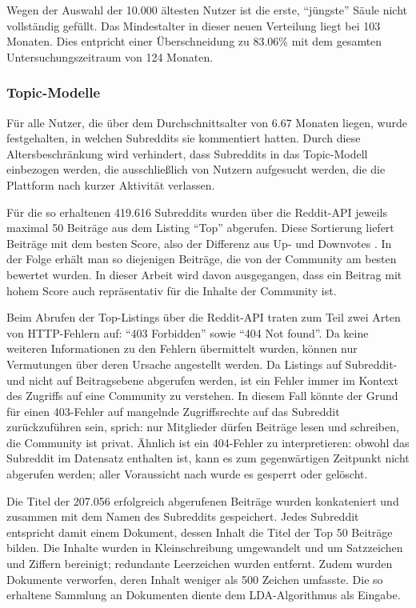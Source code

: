 \documentclass[11pt,a4paper,twoside]{article}
\begin{document}
Wegen der Auswahl der 10.000 ältesten Nutzer ist die erste,
\enquote{jüngste} Säule nicht vollständig gefüllt. Das Mindestalter in
dieser neuen Verteilung liegt bei 103 Monaten. Dies entpricht einer
Überschneidung zu 83.06\% mit dem gesamten Untersuchungszeitraum von 124
Monaten.

\hypertarget{topic-modelle-1}{%
\subsubsection{Topic-Modelle}\label{topic-modelle-1}}

Für alle Nutzer, die über dem Durchschnittsalter von 6.67 Monaten
liegen, wurde festgehalten, in welchen Subreddits sie kommentiert
hatten. Durch diese Altersbeschränkung wird verhindert, dass Subreddits
in das Topic-Modell einbezogen werden, die ausschließlich von Nutzern
aufgesucht werden, die die Plattform nach kurzer Aktivität verlassen.

Für die so erhaltenen 419.616 Subreddits wurden über die Reddit-API
jeweils maximal 50 Beiträge aus dem Listing \enquote{Top} abgerufen.
Diese Sortierung liefert Beiträge mit dem besten Score, also der
Differenz aus Up- und Downvotes \autocite{RedditSrc}. In der Folge
erhält man so diejenigen Beiträge, die von der Community am besten
bewertet wurden. In dieser Arbeit wird davon ausgegangen, dass ein
Beitrag mit hohem Score auch repräsentativ für die Inhalte der Community
ist.

Beim Abrufen der Top-Listings über die Reddit-API traten zum Teil zwei
Arten von HTTP-Fehlern auf: \enquote{403 Forbidden} sowie \enquote{404
Not found}. Da keine weiteren Informationen zu den Fehlern übermittelt
wurden, können nur Vermutungen über deren Ursache angestellt werden. Da
Listings auf Subreddit- und nicht auf Beitragsebene abgerufen werden,
ist ein Fehler immer im Kontext des Zugriffs auf eine Community zu
verstehen. In diesem Fall könnte der Grund für einen 403-Fehler auf
mangelnde Zugriffsrechte auf das Subreddit zurückzuführen sein, sprich:
nur Mitglieder dürfen Beiträge lesen und schreiben, die Community ist
privat. Ähnlich ist ein 404-Fehler zu interpretieren: obwohl das
Subreddit im Datensatz enthalten ist, kann es zum gegenwärtigen
Zeitpunkt nicht abgerufen werden; aller Voraussicht nach wurde es
gesperrt oder gelöscht.

Die Titel der 207.056 erfolgreich abgerufenen Beiträge wurden
konkateniert und zusammen mit dem Namen des Subreddits gespeichert.
Jedes Subreddit entspricht damit einem Dokument, dessen Inhalt die Titel
der Top 50 Beiträge bilden. Die Inhalte wurden in Kleinschreibung
umgewandelt und um Satzzeichen und Ziffern bereinigt; redundante
Leerzeichen wurden entfernt. Zudem wurden Dokumente verworfen, deren
Inhalt weniger als 500 Zeichen umfasste. Die so erhaltene Sammlung an
Dokumenten diente dem LDA-Algorithmus als Eingabe.
\end{document}
